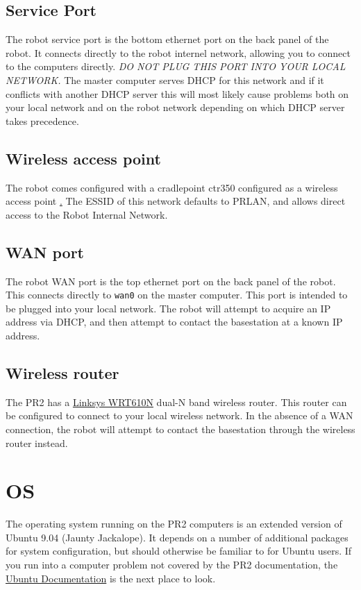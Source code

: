 \subsection{Service Port} The robot service port is the bottom
ethernet port on the back panel of the robot.  It connects directly to
the robot internel network, allowing you to connect to the computers
directly.  \textit{DO NOT PLUG THIS PORT INTO YOUR LOCAL NETWORK.}
The master computer serves DHCP for this network and if it conflicts
with another DHCP server this will most likely cause problems both on
your local network and on the robot network depending on which DHCP
server takes precedence.
\subsection{Wireless access point} The robot comes configured with a
cradlepoint ctr350 configured as a wireless access point
\href{http://www.cradlepoint.com/products/ctr350-mobile-broadband-router}.
The ESSID of this network defaults to PRLAN, and allows direct access
to the Robot Internal Network.
\subsection{WAN port} The robot WAN port is the top ethernet port on
the back panel of the robot.  This connects directly to \texttt{wan0}
on the master computer.  This port is intended to be plugged into your
local network.  The robot will attempt to acquire an IP address via
DHCP, and then attempt to contact the basestation at a known IP
address.
\subsection{Wireless router}
The PR2 has a
\href{http://www.linksysbycisco.com/US/en/products/WRT610N}{Linksys
  WRT610N} dual-N band wireless router.  This router can be configured
to connect to your local wireless network.  In the absence of a WAN
connection, the robot will attempt to contact the basestation through
the wireless router instead.

\section{OS}
The operating system running on the PR2 computers is an extended
version of Ubuntu 9.04 (Jaunty Jackalope). It depends on a number of
additional packages for system configuration, but should otherwise be
familiar to for Ubuntu users. If you run into a computer problem not
covered by the PR2 documentation, the
\href{https://help.ubuntu.com/9.04/index.html}{Ubuntu Documentation}
is the next place to look.

